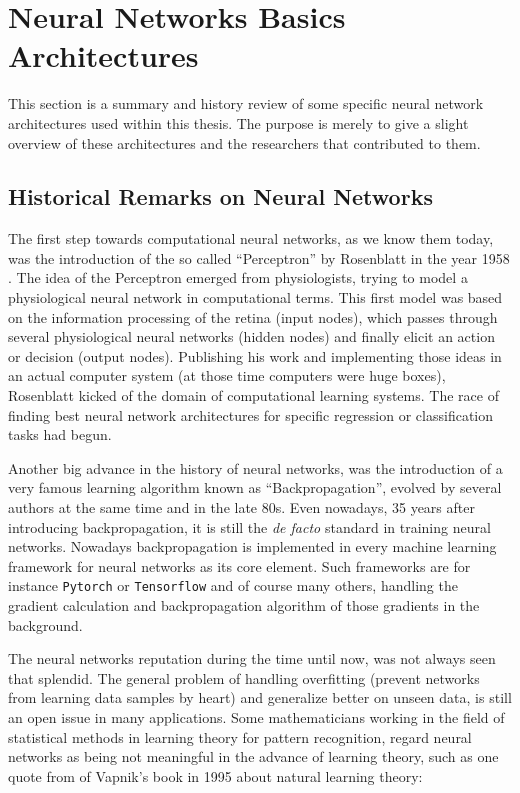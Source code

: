 
\section{Neural Networks Basics Architectures}\label{sec:prev_nn}
\thesisStateReady
This section is a summary and history review of some specific neural network architectures used within this thesis.
The purpose is merely to give a slight overview of these architectures and the researchers that contributed to them.


\subsection{Historical Remarks on Neural Networks}\label{sec:prev_nn_history}
The first step towards computational neural networks, as we know them today, was the introduction of the so called \enquote{Perceptron} by Rosenblatt in the year 1958 \cite{Rosenblatt1958}. 
The idea of the Perceptron emerged from physiologists, trying to model a physiological neural network in computational terms. 
This first model was based on the information processing of the retina (input nodes), which passes through several physiological neural networks (hidden nodes) and finally elicit an action or decision (output nodes).
Publishing his work and implementing those ideas in an actual computer system (at those time computers were huge boxes), Rosenblatt kicked of the domain of computational learning systems.
The race of finding best neural network architectures for specific regression or classification tasks had begun.

Another big advance in the history of neural networks, was the introduction of a very famous learning algorithm known as \enquote{Backpropagation}, evolved by several authors at the same time \cite{LeCun1986} and \cite{Rumelhart1986} in the late 80s. 
Even nowadays, 35 years after introducing backpropagation, it is still the \emph{de facto} standard in training neural networks.
Nowadays backpropagation is implemented in every machine learning framework for neural networks as its core element.
Such frameworks are for instance \texttt{Pytorch} or \texttt{Tensorflow} and of course many others, handling the gradient calculation and backpropagation algorithm of those gradients in the background.

The neural networks reputation during the time until now, was not always seen that splendid.
The general problem of handling overfitting (prevent networks from learning data samples by heart) and generalize better on unseen data, is still an open issue in many applications.
Some mathematicians working in the field of statistical methods in learning theory for pattern recognition, regard neural networks as being not meaningful in the advance of learning theory, such as one quote from \cite{Vapnik1995} of Vapnik's book in 1995 about natural learning theory:

